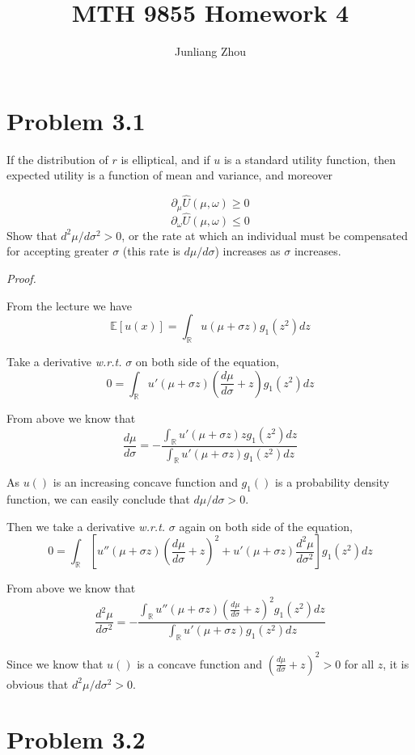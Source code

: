 \documentclass[a4paper]{article}
\title{MTH 9855 Homework 4}
\author{Junliang Zhou}
\begin{document}
\maketitle

\section{Problem 3.1}

If the distribution of $r$ is elliptical, and if $u$ is a standard utility function, then expected utility is a function of mean and variance, and moreover

\[\partial_\mu \hat U(\mu,\omega) \geq 0\]
\[\partial_\omega \hat U(\mu,\omega) \leq 0\]
Show that $d^2\mu/d\sigma^2 >0$, or the rate at which an individual must be compensated for accepting greater $\sigma$ (this rate is $d\mu/d\sigma$) increases as $\sigma$ increases.\newline

\textit{Proof.}\newline

From the lecture we have
\[\mathbb{E}[u(x)]=\int_\mathbb{R} u(\mu+\sigma z) g_1(z^2) dz\]

Take a derivative \textit{w.r.t.} $\sigma$ on both side of the equation,
\[0=\int_\mathbb{R} u'(\mu+\sigma z) \left(\frac{d\mu}{d\sigma}+z\right) g_1(z^2) dz\]

From above we know that
\[\frac{d\mu}{d\sigma}=-\frac{\int_\mathbb{R} u'(\mu+\sigma z) z g_1(z^2) dz}{\int_\mathbb{R} u'(\mu+\sigma z) g_1(z^2) dz}\]

As $u()$ is an increasing concave function and $g_1()$ is a probability density function, we can easily conclude that $d\mu/d\sigma>0$.\newline

Then we take a derivative \textit{w.r.t.} $\sigma$ again on both side of the equation,
\[0=\int_\mathbb{R} \left[ u''(\mu+\sigma z) \left(\frac{d\mu}{d\sigma}+z\right)^2 + u'(\mu+\sigma z) \frac{d^2\mu}{d\sigma^2} \right] g_1(z^2) dz\]

From above we know that
\[\frac{d^2\mu}{d\sigma^2}=-\frac{\int_\mathbb{R} u''(\mu+\sigma z) \left(\frac{d\mu}{d\sigma}+z\right)^2 g_1(z^2) dz}{\int_\mathbb{R} u'(\mu+\sigma z) g_1(z^2) dz}\]

Since we know that $u()$ is a concave function and $\left(\frac{d\mu}{d\sigma}+z\right)^2>0$ for all $z$, it is obvious that $d^2\mu/d\sigma^2 >0$.\newline

\section{Problem 3.2}
\end{document}
